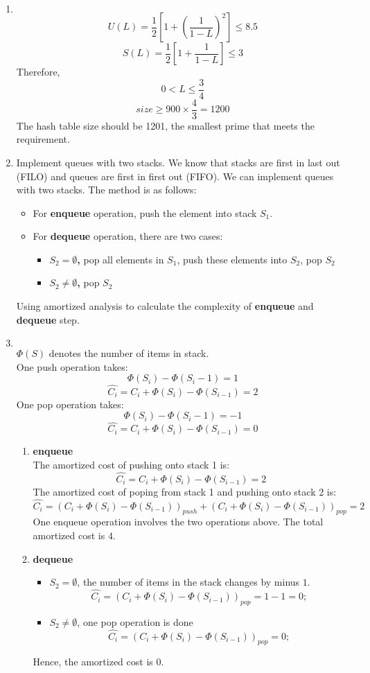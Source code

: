 \documentclass[12pt,a4paper]{article}
\makeatletter
\newtheorem*{solution}{Solution}
\theoremstyle{definition}
\renewenvironment{solution}[1][Solution] {\par\pushQED{\qed}\normalfont\topsep6\p@\@plus6\p@\relax\trivlist\item[\hskip\labelsep\bfseries#1\@addpunct{.}]\ignorespaces}{\popQED\endtrivlist\@endpefalse} \makeatother
\makeatother
\begin{document}
\begin{enumerate}
\begin{solution}
	$\ $ \\
	$$
	U(L)=\frac{1}{2}\left[1+\left(\frac{1}{1-L}\right)^{2}\right] \leq 8.5 
	$$
	$$
	S(L)=\frac{1}{2}\left[1+\frac{1}{1-L}\right] \leq 3
	$$
	Therefore,
	$$
		0 < L \leq \frac{3}{4}
	$$
	$$
		size \geq 900 \times \frac{4}{3} = 1200
	$$
	The hash table size should be 1201, the smallest prime that meets the requirement.
\end{solution}

\item Implement queues with two stacks. We know that stacks are first in last out (FILO) and queues are first in first out (FIFO). We can implement queues with two stacks. The method is as follows:
	\begin{itemize}
		\item{For \textbf{enqueue} operation,} push the element into stack $S_1$.
		\item{For \textbf{dequeue} operation,} there are two cases:
		\begin{itemize}
			\item \textbf{$S_2 = \emptyset$,} pop all elements in $S_1$, push these elements into $S_2$, pop $S_2$
			\item \textbf{$S_2 \neq \emptyset$,} pop $S_2$
		\end{itemize}
	\end{itemize}
	Using amortized analysis to calculate the complexity of \textbf{enqueue} and \textbf{dequeue} step.
\begin{solution}
	$\ $ \\
	$\Phi(S)$ denotes the number of items in stack. \\
	One push operation takes:
	$$
		\Phi(S_i) - \Phi(S_i-1) = 1
	$$
	$$
		\hat{C_i} = C_i + \Phi(S_i) - \Phi(S_{i-1}) = 2
	$$
	One pop operation takes:
	$$
		\Phi(S_i) - \Phi(S_i-1) = -1
	$$
	$$
		\hat{C_i} = C_i + \Phi(S_i) - \Phi(S_{i-1}) = 0
	$$
	\begin{enumerate}
		\item \textbf{enqueue} \\
			The amortized cost of pushing onto stack 1 is:
			$$
				\hat{C_i} = C_i + \Phi(S_i) - \Phi(S_{i-1}) = 2
			$$
			The amortized cost of poping from stack 1 and pushing onto stack 2 is:
			$$
				\hat{C_i} = (C_i + \Phi(S_i) - \Phi(S_{i-1}))_{push} + (C_i + \Phi(S_i) - \Phi(S_{i-1}))_{pop}= 2
			$$
			One enqueue operation involves the two operations above. The total amortized cost is $4$.
		\item \textbf{dequeue} \\
				\begin{itemize}
					\item $S_2 = \emptyset$, the number of items in the stack changes by minus $1$.
						$$
							\hat{C_i} = (C_i + \Phi(S_i) - \Phi(S_{i-1}))_{pop}  = 1-1=0;
						$$
					\item $S_2 \neq \emptyset$, one pop operation is done
						$$
							\hat{C_i} = (C_i + \Phi(S_i) - \Phi(S_{i-1}))_{pop} = 0;
						$$
				\end{itemize}
				Hence, the amortized cost is $0$.
	\end{enumerate}
\end{solution}


\end{enumerate}
\end{document}
